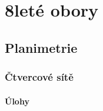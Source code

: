 \section{8leté obory}
\label{sec:8lete-obory}

\subsection{Planimetrie}
\label{subsec:planimetrie}

\subsubsection{Čtvercové sítě}

\paragraph{Úlohy}
